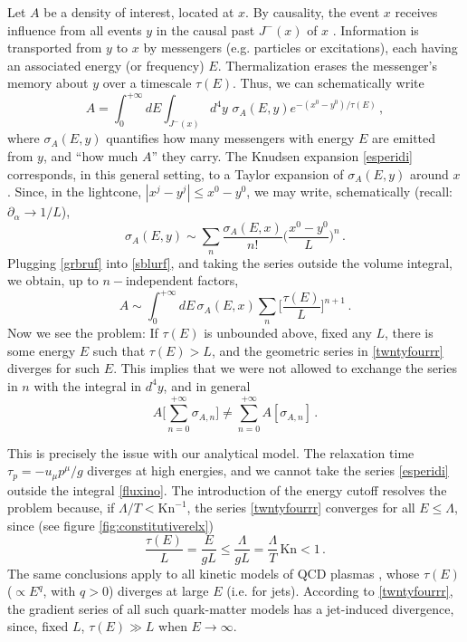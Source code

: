 \documentclass[a4paper, amsfonts, amssymb, amsmath, reprint, showkeys, twoside,notitlepage]{revtex4-2}
\newcommand{\Kn}{\text{Kn}}
\begin{document}
Let $A$ be a density of interest, located at $x$. By causality, the event $x$ receives influence from all events $y$ in the causal past $J^-(x)$ of $x$ \cite{Wald}. Information is transported from $y$ to $x$  by messengers (e.g. particles or excitations), each having an associated energy (or frequency) $E$. Thermalization erases the messenger's memory about $y$ over a timescale $\tau(E)$. Thus, we can schematically write
\begin{equation}\label{sblurf}
    A = \int_0^{+\infty} \! \! \! dE \int_{J^-(x)} \! \! \! d^4 y \, \,  \sigma_A(E,y) e^{-(x^0-y^0)/\tau(E)} \, ,
\end{equation}
where $\sigma_A(E,y)$ quantifies how many messengers with energy $E$ are emitted from $y$, and ``how much $A$'' they carry. The Knudsen expansion \eqref{esperidi} corresponds, in this general setting, to a Taylor expansion of $\sigma_A(E,y)$ around $x$. Since, in the lightcone, $|x^j-y^j| \leq x^0-y^0$, we may write, schematically (recall: $\partial_\alpha \rightarrow 1/L$),
\begin{equation}\label{grbruf}
    \sigma_A(E,y)\sim \sum_{n} \dfrac{\sigma_A(E,x)}{n!} \bigg(\dfrac{x^0-y^0}{L}\bigg)^n \, .
\end{equation}
Plugging \eqref{grbruf} into \eqref{sblurf}, and taking the series outside the volume integral, we obtain, up to $n-$independent factors,
\begin{equation}\label{twntyfourrr}
    A \sim \int_0^{+\infty} \! \! \! dE \, \sigma_A(E,x) \sum_n \bigg[\dfrac{\tau(E)}{L} \bigg]^{n+1} \, .
\end{equation}
Now we see the problem: If $\tau(E)$ is unbounded above, fixed any $L$, there is some energy $E$ such that $\tau(E)>L$, and the geometric series in \eqref{twntyfourrr} diverges for such $E$. This implies that we were not allowed to exchange the series in $n$ with the integral in $d^4 y$, and in general \cite{Rudin_book}
\begin{equation}
    A\bigg[ \sum_{n=0}^{+\infty} \sigma_{A,n} \bigg] \neq \sum_{n=0}^{+\infty} A[\sigma_{A,n}] \, .
\end{equation}

This is precisely the issue with our analytical model. The relaxation time $\tau_p=-u_\mu p^\mu/g$ diverges at high energies, and we cannot take the series \eqref{esperidi} outside the integral \eqref{fluxino}. The introduction of the energy cutoff resolves the problem because, if $\Lambda/T<\Kn^{-1}$, the series \eqref{twntyfourrr} converges for all $E\leq \Lambda$, since (see figure \ref{fig:constitutiverelx})
\begin{equation}
    \dfrac{\tau(E)}{L}= \dfrac{E}{gL} \leq \dfrac{\Lambda}{gL}=\dfrac{\Lambda}{T} \, \Kn <1 \, .
\end{equation}
The same conclusions apply to all kinetic models of QCD plasmas \cite{Dusling:2009df,Dusling:2011fd,Kurkela:2017xis}, whose $\tau(E)$ ($\propto E^{q}$, with $q{>}0$) diverges at large $E$ (i.e. for jets). According to \eqref{twntyfourrr}, the gradient series of all such quark-matter models has a jet-induced divergence, since, fixed $L$, $\tau(E){\gg}L$ when $E {\rightarrow} \infty$.
\end{document}
